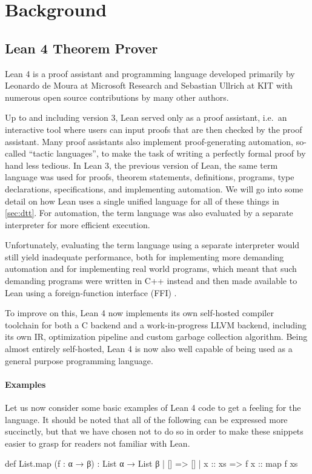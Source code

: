 \chapter{Background}\label{sec:background}

\section{Lean 4 Theorem Prover}\label{sec:lean4}
Lean 4 is a proof assistant and programming language developed primarily by Leonardo de Moura at Microsoft Research and Sebastian Ullrich at KIT with numerous open source contributions by many other authors.

Up to and including version 3, Lean served only as a proof assistant, i.e.\ an interactive tool where users can input proofs that are then checked by the proof assistant. Many proof assistants also implement proof-generating automation, so-called ``tactic languages'', to make the task of writing a perfectly formal proof by hand less tedious. In Lean 3, the previous version of Lean, the same term language was used for proofs, theorem statements, definitions, programs, type declarations, specifications, and implementing automation. We will go into some detail on how Lean uses a single unified language for all of these things in \cref{sec:dtt}. For automation, the term language was also evaluated by a separate interpreter for more efficient execution.

Unfortunately, evaluating the term language using a separate interpreter would still yield inadequate performance, both for implementing more demanding automation and for implementing real world programs, which meant that such demanding programs were written in C++ instead and then made available to Lean using a foreign-function interface (FFI) \citep{ullrich_counting_2020}.

To improve on this, Lean 4 now implements its own self-hosted compiler toolchain for both a C backend and a work-in-progress LLVM \citep{lattner_llvm_2004} backend, including its own IR, optimization pipeline and custom garbage collection algorithm. Being almost entirely self-hosted, Lean 4 is now also well capable of being used as a general purpose programming language.

\subsubsection{Examples}
Let us now consider some basic examples of Lean 4 code to get a feeling for the language. It should be noted that all of the following can be expressed more succinctly, but that we have chosen not to do so in order to make these snippets easier to grasp for readers not familiar with Lean.\\
\begin{code}
def List.map (f : α → β) : List α → List β
  | []      => []
  | x :: xs => f x :: map f xs
\end{code}

